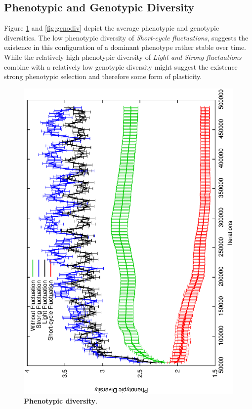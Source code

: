 \subsection{Phenotypic and Genotypic Diversity}
Figure \ref{fig:phenodiv} and \ref{fig:genodiv} depict the average phenotypic and genotypic diversities. The low phenotypic diversity of \emph{Short-cycle fluctuations}, suggests the existence in this configuration of a dominant phenotype rather stable over time. While the relatively high phenotypic diversity of \emph{Light and Strong fluctuations} combine with a relatively low genotypic diversity might suggest the existence strong phenotypic selection and therefore some form of plasticity.



\begin{figure}[h]
\centering
\includegraphics[width=0.7\columnwidth, angle =-90 ]{img/PhenoDiv}
\caption{\textbf{Phenotypic diversity}.}
\label{fig:phenodiv}
\end{figure}

